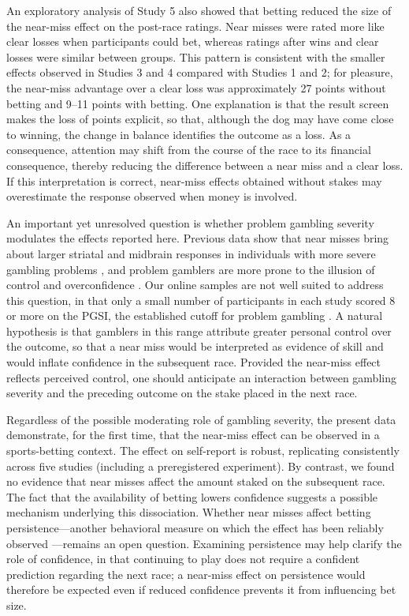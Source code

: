 \documentclass[man,floatsintext,donotrepeattitle]{apa7}
\begin{document}
An exploratory analysis of Study 5 also showed that betting reduced the size of the near-miss effect on the post-race ratings. Near misses were rated more like clear losses when participants could bet, whereas ratings after wins and clear losses were similar between groups. This pattern is consistent with the smaller effects observed in Studies 3 and 4 compared with Studies 1 and 2; for pleasure, the near-miss advantage over a clear loss was approximately 27 points without betting and 9--11
points with betting. One explanation is that the result screen makes the loss of points explicit, so that, although the dog may have come close to winning, the change in balance identifies the outcome as a loss. As a consequence, attention may shift from the course of the race to its
financial consequence, thereby reducing the difference between a near miss and a clear loss. If this interpretation is correct, near-miss effects obtained without stakes may overestimate the response observed when money is involved. 

An important yet unresolved question is whether problem gambling severity modulates the effects reported here. Previous data show that near misses bring about larger striatal and midbrain responses in individuals with more severe gambling problems \parencite{chaseclark2010, sescousse2016}, and problem gamblers are more prone to the illusion of control and overconfidence \parencite{goodie2005, orgaz2013}. Our online samples are not well suited to address this question, in that only a small number of participants in each study scored 8 or more on the PGSI, the established cutoff for problem gambling \parencite{ferriswynne2001}. A natural hypothesis is that gamblers in this range attribute greater personal control over the outcome, so that a near miss would be interpreted as evidence of skill and would inflate confidence in the subsequent race. Provided the near-miss effect reflects perceived control, one should anticipate an interaction between gambling severity and the preceding outcome on the stake placed in the next race.

Regardless of the possible moderating role of gambling severity, the present data demonstrate, for the first time, that the near-miss effect can be observed in a sports-betting context. The effect on self-report is robust, replicating consistently across five studies (including a preregistered experiment). By contrast, we found no evidence that near misses affect the amount staked on the subsequent race. The fact that the availability of betting lowers confidence suggests a possible mechanism underlying this dissociation. Whether near misses affect betting persistence---another behavioral measure on which the effect has been reliably observed \parencite{kassinove2001, cote2003, barton2017}---remains an open question. Examining persistence may help clarify the role of confidence, in that continuing to play does not require a confident prediction regarding the next race; a near-miss effect on persistence would therefore be expected even if reduced confidence prevents it from influencing bet size.
\end{document}
